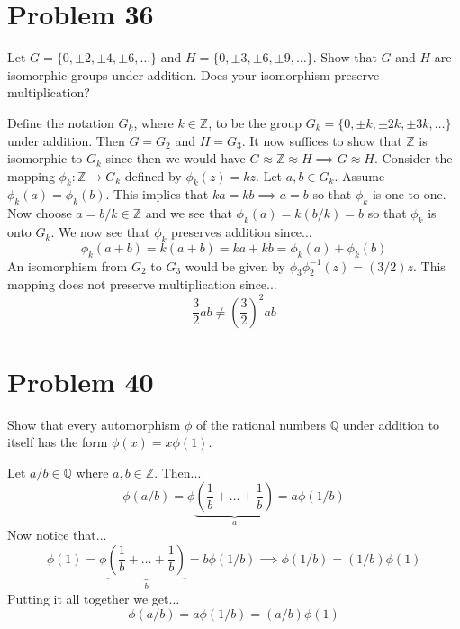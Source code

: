 \documentclass{article}
\begin{document}
\section*{Problem 36}

Let $G=\{0,\pm 2, \pm 4, \pm 6, \dots\}$ and $H=\{0,\pm 3,\pm 6,\pm 9, \dots\}$.
Show that $G$ and $H$ are isomorphic groups under addition.  Does your
isomorphism preserve multiplication?

Define the notation $G_k$, where $k\in\mathbb{Z}$, to be the
group $G_k=\{0,\pm k, \pm 2k, \pm 3k, \dots\}$ under addition.
Then $G=G_2$ and $H=G_3$.  It now suffices to show that $\mathbb{Z}$ is isomorphic
to $G_k$ since then we would have $G\approx\mathbb{Z}\approx H\implies G\approx H$.
Consider the mapping $\phi_k:\mathbb{Z}\to G_k$ defined by $\phi_k(z)=kz$.
Let $a,b\in G_k$.  Assume $\phi_k(a)=\phi_k(b)$.  This implies that $ka=kb\implies a=b$
so that $\phi_k$ is one-to-one.  Now choose $a=b/k\in\mathbb{Z}$ and we see
that $\phi_k(a)=k(b/k) = b$ so that $\phi_k$ is onto $G_k$.
We now see that $\phi_k$ preserves addition since...
\begin{equation*}
\phi_k(a+b)=k(a+b) = ka+kb = \phi_k(a)+\phi_k(b)
\end{equation*}
An isomorphism from $G_2$ to $G_3$ would be given by $\phi_3\phi_2^{-1}(z)=(3/2)z$.
This mapping does not preserve multiplication since...
\begin{equation*}
\frac{3}{2}ab \neq \left(\frac{3}{2}\right)^2ab
\end{equation*}

\section*{Problem 40}

Show that every automorphism $\phi$ of the rational numbers $\mathbb{Q}$ under
addition to itself has the form $\phi(x)=x\phi(1)$.

Let $a/b\in\mathbb{Q}$ where $a,b\in\mathbb{Z}$.  Then...
\begin{equation*}
\phi(a/b) = \phi\underbrace{\left(\frac{1}{b}+\dots+\frac{1}{b}\right)}_a = a\phi(1/b)
\end{equation*}
Now notice that...
\begin{equation*}
\phi(1) = \phi\underbrace{\left(\frac{1}{b}+\dots+\frac{1}{b}\right)}_b = b\phi(1/b)\implies
\phi(1/b) = (1/b)\phi(1)
\end{equation*}
Putting it all together we get...
\begin{equation*}
\phi(a/b) = a\phi(1/b) = (a/b)\phi(1)
\end{equation*}
\end{document}
